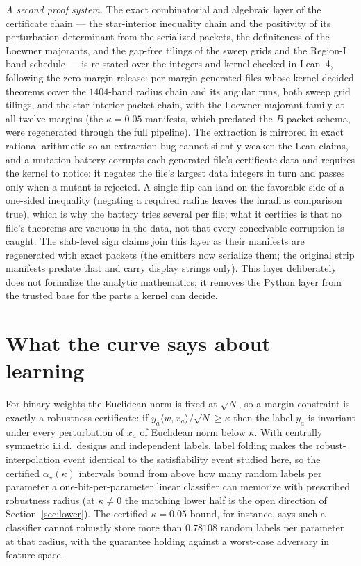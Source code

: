 \documentclass[11pt]{article}
\theoremstyle{remark}
\begin{document}
\emph{A second proof system.}  The exact combinatorial and algebraic
layer of the certificate chain --- the star-interior inequality chain
and the positivity of its perturbation determinant from the
serialized packets, the definiteness of the Loewner majorants, and
the gap-free tilings of the sweep grids and the Region-I band
schedule --- is re-stated over the integers and kernel-checked in
Lean~4, following the zero-margin release: per-margin generated files
whose kernel-decided theorems cover the $1404$-band radius
chain and its angular runs, both sweep grid tilings, and the
star-interior packet chain, with the Loewner-majorant family at all
twelve margins (the $\kappa=0.05$ manifests, which predated the
$B$-packet schema, were regenerated through the full pipeline).  The
extraction is mirrored in exact
rational arithmetic so an extraction bug cannot silently weaken the
Lean claims, and a mutation battery corrupts each generated file's
certificate data and requires the kernel to notice: it negates the
file's largest data integers in turn and passes only when a mutant
is rejected.  A single flip can land on the favorable side of a
one-sided inequality (negating a required radius leaves the
inradius comparison true), which is why the battery tries several
per file; what it certifies is that no file's theorems are vacuous
in the data, not that every conceivable corruption is caught.  The slab-level sign claims
join this layer as their manifests are regenerated with exact
packets (the emitters now serialize them; the original strip
manifests predate that and carry display strings only).  This layer
deliberately does not formalize the analytic mathematics; it removes
the Python layer from the trusted base for the parts a kernel can
decide.

\section{What the curve says about learning}\label{sec:ml}

For binary weights the Euclidean norm is fixed at $\sqrt N$, so a
margin constraint is exactly a robustness certificate: if
$y_a\langle w,x_a\rangle/\sqrt N\ge\kappa$ then the label $y_a$ is
invariant under every perturbation of $x_a$ of Euclidean norm below
$\kappa$.  With centrally symmetric i.i.d.\ designs and independent
labels, label folding makes the robust-interpolation event identical
to the satisfiability event studied here, so the certified
$\alpha_\star(\kappa)$ intervals bound from above how many random
labels per parameter a one-bit-per-parameter linear classifier
can memorize with prescribed robustness radius (at $\kappa\ne0$ the
matching lower half is the open direction of Section~\ref{sec:lower}).  The certified $\kappa=0.05$ bound, for instance,
says such a classifier cannot robustly store more than $0.78108$
random labels per parameter at that radius, with the guarantee
holding against a worst-case adversary in feature space.
\end{document}
